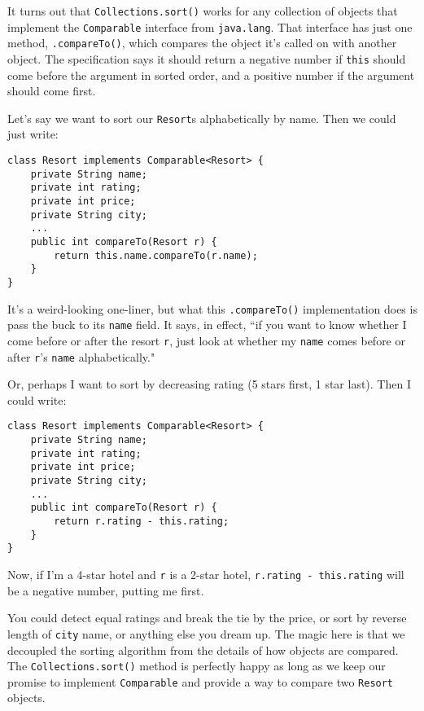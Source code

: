 It turns out that \texttt{Collections.sort()} works for any collection of
objects that implement the \texttt{Comparable} interface from
\texttt{java.lang}. That interface has just one method, \texttt{.compareTo()},
which compares the object it's called on with another object. The
specification says it should return a negative number if \texttt{this} should
come before the argument in sorted order, and a positive number if the
argument should come first.

Let's say we want to sort our \texttt{Resort}s alphabetically by name. Then we
could just write:

\begin{Verbatim}[fontsize=\small,samepage=true,frame=single]
class Resort implements Comparable<Resort> {
    private String name;
    private int rating;
    private int price;
    private String city;
    ...
    public int compareTo(Resort r) {
        return this.name.compareTo(r.name);
    }
}
\end{Verbatim}

It's a weird-looking one-liner, but what this \texttt{.compareTo()}
implementation does is pass the buck to its \texttt{name} field. It says, in
effect, ``if you want to know whether I come before or after the resort
\texttt{r}, just look at whether my \texttt{name} comes before or after
\texttt{r}'s \texttt{name} alphabetically."

Or, perhaps I want to sort by decreasing rating (5 stars first, 1 star last).
Then I could write:

\begin{Verbatim}[fontsize=\small,samepage=true,frame=single]
class Resort implements Comparable<Resort> {
    private String name;
    private int rating;
    private int price;
    private String city;
    ...
    public int compareTo(Resort r) {
        return r.rating - this.rating;
    }
}
\end{Verbatim}

Now, if I'm a 4-star hotel and \texttt{r} is a 2-star hotel, \texttt{r.rating
- this.rating} will be a negative number, putting me first.

You could detect equal ratings and break the tie by the price, or sort by
reverse length of \texttt{city} name, or anything else you dream up. The magic
here is that we decoupled the sorting algorithm from the details of how
objects are compared. The \texttt{Collections.sort()} method is perfectly
happy as long as we keep our promise to implement \texttt{Comparable} and
provide a way to compare two \texttt{Resort} objects.


